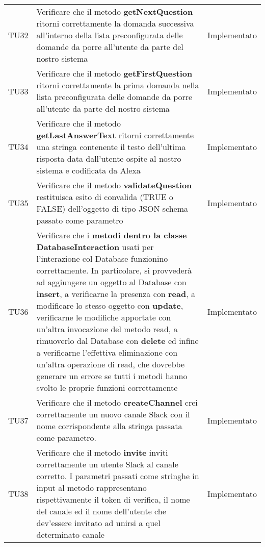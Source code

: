 \documentclass[../PianoDiQualifica_v3.0.0.tex]{subfiles}
\begin{document}
\begin{longtable}[c] { >{\centering\arraybackslash}p{2cm} p{9cm} >{\centering\arraybackslash}p{4cm}}
			\addlinespace[0.3em]
			\midrule
			\addlinespace[0.3em]
			TU32 & Verificare che il metodo \textbf{getNextQuestion} ritorni correttamente la domanda successiva all'interno della lista preconfigurata delle domande da porre all'utente da parte del nostro sistema & Implementato \\
			\addlinespace[0.3em]
			\midrule
			\addlinespace[0.3em]
			TU33 & Verificare che il metodo \textbf{getFirstQuestion} ritorni correttamente la prima domanda nella lista preconfigurata delle domande da porre all'utente da parte del nostro sistema & Implementato \\
			\addlinespace[0.3em]
			\midrule
			\addlinespace[0.3em]
			TU34 & Verificare che il metodo \textbf{getLastAnswerText} ritorni correttamente una stringa contenente il testo dell'ultima risposta data dall'utente ospite al nostro sistema e codificata da Alexa & Implementato \\
			\addlinespace[0.3em]
			\midrule
			\addlinespace[0.3em]
			TU35 & Verificare che il metodo \textbf{validateQuestion} restituisca esito di convalida (TRUE o FALSE) dell'oggetto di tipo JSON schema passato come parametro & Implementato \\
			\addlinespace[0.3em]
			\midrule
			\addlinespace[0.3em]
			TU36 & Verificare che i \textbf{metodi dentro la classe DatabaseInteraction} usati per l'interazione col Database funzionino correttamente. In particolare, si provvederà ad aggiungere un oggetto al Database con \textbf{insert}, a verificarne la presenza con \textbf{read}, a modificare lo stesso oggetto con \textbf{update}, verificarne le modifiche apportate con un'altra invocazione del metodo read, a rimuoverlo dal Database con \textbf{delete} ed infine a verificarne l'effettiva eliminazione con un'altra operazione di read, che dovrebbe generare un errore se tutti i metodi hanno svolto le proprie funzioni correttamente & Implementato \\
			\addlinespace[0.3em]
			\midrule
			\addlinespace[0.3em]
			TU37 & Verificare che il metodo \textbf{createChannel} crei correttamente un nuovo canale Slack con il nome corrispondente alla stringa passata come parametro. & Implementato \\
			\addlinespace[0.3em]
			\midrule
			\addlinespace[0.3em]
			TU38 & Verificare che il metodo \textbf{invite} inviti correttamente un utente Slack al canale corretto. I parametri passati come stringhe in input al metodo rappresentano rispettivamente il token di verifica, il nome del canale ed il nome dell'utente che dev'essere invitato ad unirsi a quel determinato canale & Implementato \\

\end{longtable}
\end{document}

